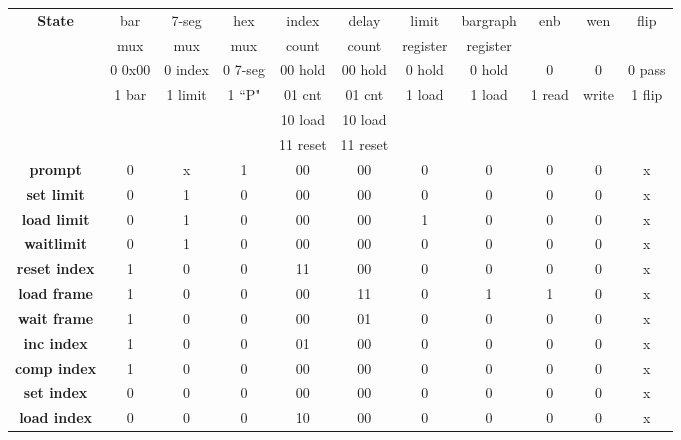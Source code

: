 \begin{table}
    {\tiny
        \begin{tabular}{c||c|c|c|c|c|c|c|c|c|c}
            \textbf{ State }     & bar & 7-seg & hex & index & delay & limit    & bargraph & enb & wen   & flip \\
            & mux & mux   & mux & count & count & register & register &          &         &       \\  \hline \hline
            & 0 0x00 & 0 index & 0 7-seg & 00 hold & 00 hold & 0 hold & 0 hold   & 0       & 0       &0 pass \\
            & 1 bar    & 1 limit & 1 ``P"& 01 cnt & 01 cnt & 1 load &    1 load              & 1 read & write
            & 1 flip \\
            &     &     &     & 10 load & 10 load & & &  \\
            &     &     &        & 11 reset    & 11 reset & & \\ \hline \hline
            \textbf{ prompt }      &     0 &    x &    1 &    00 &    00 &    0 &    0 &    0 &    0 & x \\ \hline
            \textbf{ set limit }  &     0 &    1 &    0 &    00 &    00 &    0 &    0 &    0 &    0 & x \\ \hline
            \textbf{ load limit } &    0 &    1 &    0 &    00 &    00 &    1 &    0 &    0 &    0 & x \\ \hline
            \textbf{ waitlimit } &    0 &    1 &    0 &    00 &    00 &    0 &    0 &    0 &    0 & x \\ \hline
            \textbf{ reset index } &    1 &    0 &     0 &    11 &    00 &    0 &    0 &    0 &    0 & x \\ \hline
            \textbf{ load frame } &    1 &    0 &    0 &    00 &    11 &    0 &    1 &    1 &    0 & x \\ \hline
            \textbf{ wait frame } &    1 &    0 &    0 &    00 &    01 &    0 &    0 &    0 &    0 & x \\ \hline
            \textbf{ inc index } &    1 &    0 &    0 &    01 &    00 &    0 &    0 &    0 &    0 & x \\ \hline
            \textbf{ comp index } &    1 &    0 &    0 &    00 &    00 &    0 &    0 &    0 &    0 & x \\ \hline
            \textbf{ set index } &    0 &    0 &    0 &    00 &     00 &    0 &     0 &    0 &    0 & x \\ \hline
            \textbf{ load index } &    0 &    0 &     0 &    10 &    00 &    0 &    0 &    0 & 0 & x \\ \hline

\end{tabular}}
\end{table}
